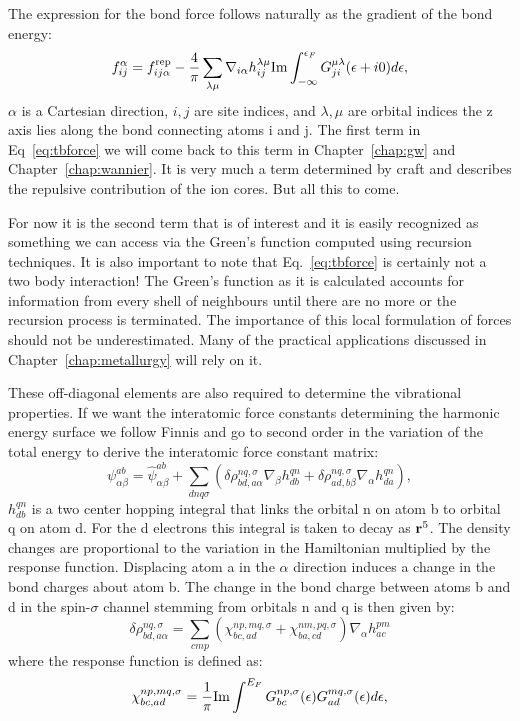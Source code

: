 The expression for the bond force follows naturally as the gradient of the bond energy:
%
\begin{equation}
\label{eq:tbforce}
f_{ij}^{\alpha} = f^{\rm rep}_{ij\alpha} - \frac{4}{\pi}\sum_{\lambda\mu} 
\nabla_{i\alpha}h_{ij}^{\lambda\mu}{\rm Im}\int_{-\infty}^{\epsilon_{F}}G_{ji}^{\mu\lambda}(\epsilon+i0)d\epsilon,
\end{equation}
%
$\alpha$ is a Cartesian direction, $i,j$ are site indices, and $\lambda, \mu$ are orbital indices 
the z axis lies along the bond connecting atoms i and j. The first term in Eq~\ref{eq:tbforce} 
we will come back to this term in Chapter~\ref{chap:gw} and Chapter~\ref{chap:wannier}. 
It is very much a term determined by craft and describes the repulsive contribution of the ion cores. 
But all this to come. 

For now it is the second term that is of interest and
it is easily recognized as something we can access via the Green's function 
computed using recursion techniques. It is also important to note that 
Eq.~\ref{eq:tbforce} is certainly not a two body interaction! The Green's function 
as it is calculated accounts for information from every shell of neighbours 
until there are no more or the recursion process is terminated. 
The importance of this local formulation of forces should not be underestimated.
Many of the practical applications discussed in Chapter~\ref{chap:metallurgy} 
will rely on it.

%
These off-diagonal elements are also required to determine the vibrational properties. 
If we want the interatomic force constants determining the harmonic energy surface 
we follow Finnis\cite{finnis84} and go to second order in the variation of the 
total energy to derive the interatomic force constant matrix:
%
\begin{equation}
\label{eq:tbdynmat}
\psi_{\alpha\beta}^{ab} = \hat{\psi}_{\alpha\beta}^{ab} +  \sum_{dnq\sigma}(\delta 
\rho_{bd,a\alpha}^{nq,\sigma}\nabla_{\beta}h_{db}^{qn} + \delta\rho_{ad,b\beta}^{nq,\sigma}\nabla_{\alpha}h_{da}^{qn}),
\end{equation}
%
$h^{qn}_{db}$ is a two center hopping integral that links the orbital n on atom b to orbital 
q on atom d. For the d electrons this integral is taken to decay as
${\bf r}^{5}$. The density changes are proportional to the variation in the Hamiltonian 
multiplied by the response function. Displacing atom a in the $\alpha$ direction induces a change in the
bond charges about atom b. The change in the bond charge between atoms b and d 
in the spin-$\sigma$ channel stemming from orbitals n and q is then given by:
%
\begin{equation}
\label{eq:tbdeltarho}
\delta \rho_{bd,a\alpha}^{nq,\sigma} = \sum_{cmp}(\chi_{bc,ad}^{np,mq,\sigma}+\chi_{ba,cd}^{nm,pq,\sigma})\nabla_{\alpha}h_{ac}^{pm}
\end{equation}
%
where the response function is defined as:
%
\begin{equation}
\label{eq:tbresponse}
\chi_{bc,ad}^{np,mq,\sigma} = \frac{1}{\pi}{\rm Im}\int^{E_{F}}G_{bc}^{np,\sigma}(\epsilon)G_{ad}^{mq,\sigma}(\epsilon)d\epsilon,
\end{equation}
%

